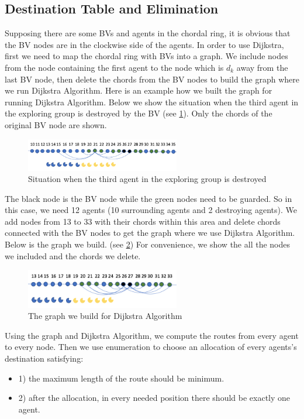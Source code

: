 \subsection{Destination Table and Elimination}
Supposing there are some BVs and agents in the chordal ring, it is obvious that the BV nodes are in the clockwise side of the agents. In order to use Dijkstra, first we need to map the chordal ring with BVs into a graph. We include nodes from the node containing the first agent to the node which is $d_k$ away from the last BV node, then delete the chords from the BV nodes to build the graph where we run Dijkstra Algorithm.
Here is an example how we built the graph for running Dijkstra Algorithm. Below we show the situation when the third agent in the exploring group is destroyed by the BV (see \ref{fig:D1}). Only the chords of the original BV node are shown. 
\begin{figure}[H]
  \centering  
  \includegraphics[width=0.6\textwidth]{figures/D1.png}
  \caption{Situation when the third agent in the exploring group is destroyed}\label{fig:D1}
\end{figure} 

The black node is the BV node while the green nodes need to be guarded. So in this case, we need 12 agents (10 surrounding agents and 2 destroying agents). 
We add nodes from 13 to 33 with their chords within this area and delete chords connected with the BV nodes to get the graph where we use Dijkstra Algorithm. Below is the graph we build. (see \ref{fig:D2}) For convenience, we show the all the nodes we included and the chords we delete.
\begin{figure}[H]
  \centering  
  \includegraphics[width=0.6\textwidth]{figures/D2.png}
  \caption{The graph we build for Dijkstra Algorithm}\label{fig:D2}
\end{figure} 
Using the graph and Dijkstra Algorithm, we compute the routes from every agent to every node. Then we use enumeration to choose an allocation of every agents's destination satisfying: 
\begin{itemize}
\item 1) the maximum length of the route should be minimum. 
\item 2) after the allocation, in every needed position there should be exactly one agent.
\end{itemize}

